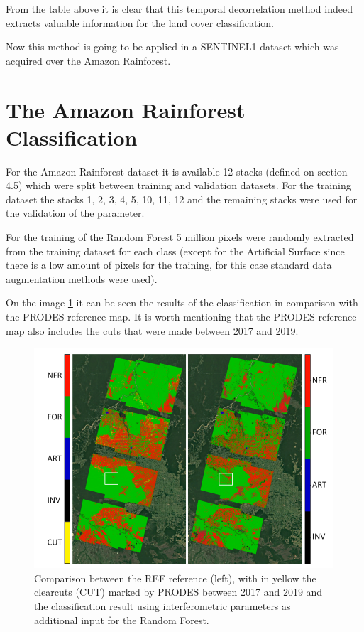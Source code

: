 From the table above it is clear that this temporal decorrelation method indeed extracts valuable information for the land cover classification.

Now this method is going to be applied in a SENTINEL1 dataset which was acquired over the Amazon Rainforest.

\section{The Amazon Rainforest Classification}
For the Amazon Rainforest dataset it is available 12 stacks (defined on section 4.5) which were split between training and validation datasets. For the training dataset the stacks 1, 2, 3, 4, 5, 10, 11, 12 and the remaining stacks were used for the validation of the parameter. 

For the training of the Random Forest 5 million pixels were randomly extracted from the training dataset for each class (except for the Artificial Surface since there is a low amount of pixels for the training, for this case standard data augmentation methods were used). 

On the image \ref{fig:results_rondonia} it can be seen the results of the classification in comparison with the PRODES reference map. It is worth mentioning that the PRODES reference map also includes the cuts that were made between 2017 and 2019.

\begin{figure}[H]
    \centering
    \includegraphics{Cap4/classificacaoamazon.png}
    \caption{Comparison between the REF reference (left), with in yellow the clearcuts (CUT) marked by
PRODES between 2017 and 2019 and the classification result using interferometric parameters as additional input for the Random Forest.}
    \label{fig:results_rondonia}
\end{figure}

